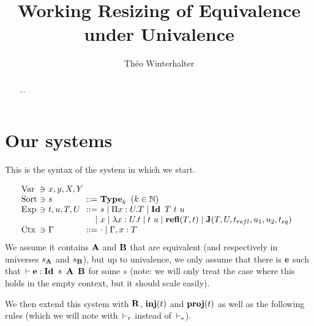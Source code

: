 \documentclass[a4paper,english]{lipics-utf8x}
\title{Working Resizing of Equivalence under Univalence}
\author[1]{Théo Winterhalter}
\begin{document}
  \maketitle

  \begin{abstract}
    ...
  \end{abstract}

  \section{Our systems}

  This is the syntax of the system in which we start.

  \[
    \begin{array}{l@{~}l@{~}l@{~}r@{~}l@{\quad}l}
      \Var  & \ni & x,y,X,Y \\
      \Sort & \ni & s             & ::= & \Type_k \mbox{ }
                                                (k \in \mathbb{N}) \\
      \Exp  & \ni & t,u,T,U & ::= & s \mid \Pi x:U.T \mid
                                    \Id T\ t\ u \\
                         &&& \mid & x \mid \lambda x:U.t \mid t~u
                               \mid \refl(T,t) \mid
                               \J (T,U,t_{refl},u_1,u_2,t_{eq}) \\
      \Ctx  & \ni & \Gamma  & ::= & \cdot \mid \Gamma, x:T \\
    \end{array}
  \]
  We assume it contains $\operatorname{\mathbf{A}}$ and $\operatorname{\mathbf{B}}$ that are equivalent (and respectively in
  universes $s_{\operatorname{\mathbf{A}}}$ and $s_{\operatorname{\mathbf{B}}}$), but up to univalence, we only assume that
  there is $\operatorname{\mathbf{e}}$ such that $\,\vdash \operatorname{\mathbf{e}} : \operatorname{\mathbf{Id}~} s\ \operatorname{\mathbf{A}}\ \operatorname{\mathbf{B}}$ for some $s$
  (note: we will only treat the case where this holds in the empty context,
  but it should scale easily).

  We then extend this system with $\operatorname{\mathbf{R}}$, $\operatorname{\mathbf{inj}}(t)$ and $\operatorname{\mathbf{proj}}(t)$ as well as
  the following rules (which we will note with $\,\vdash_r$ instead of $\,\vdash_e$).

  \begin{mathc}
    \ru{\derr \Gamma
      }{\Gamma \derr \mR : \sB}
    \qquad
    \qquad
  \end{mathc}

  \begin{mathc}
    \qquad
  \end{mathc}
\end{document}
